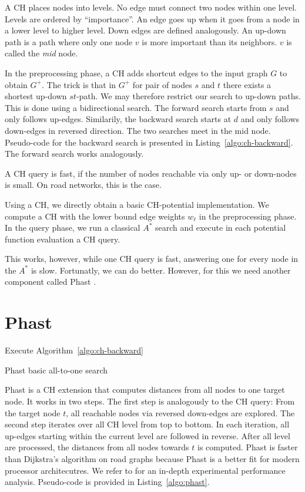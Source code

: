 \documentclass[a4paper,UKenglish,cleveref, autoref]{lipics-v2019}
\begin{document}
A CH places nodes into levels.
No edge must connect two nodes within one level.
Levels are ordered by ``importance''.
An edge goes up when it goes from a node in a lower level to higher level.
Down edges are defined analogously.
An up-down path is a path where only one node $v$ is more important than its neighbors.
$v$ is called the \emph{mid} node.

In the preprocessing phase, a CH adds shortcut edges to the input graph $G$ to obtain $G^+$.
The trick is that in $G^+$ for pair of nodes $s$ and $t$ there exists a shortest up-down $st$-path.
We may therefore restrict our search to up-down paths.
This is done using a bidirectional search.
The forward search starts from $s$ and only follows up-edges.
Similarily, the backward search starts at $d$ and only follows down-edges in reversed direction.
The two searches meet in the mid node.
Pseudo-code for the backward search is presented in Listing~\ref{algo:ch-backward}.
The forward search works analogously.

A CH query is fast, if the number of nodes reachable via only up- or down-nodes is small.
On road networks, this is the case.

Using a CH, we directly obtain a basic CH-potential implementation.
We compute a CH with the lower bound edge weights $w_\ell$ in the preprocessing phase.
In the query phase, we run a classical $A^*$ search and execute in each potential function evaluation a CH query.

This works, however, while one CH query is fast, answering one for every node in the $A^*$ is slow.
Fortunatly, we can do better.
However, for this we need another component called Phast \cite{Phast}.

\section{Phast}

\begin{algorithm2e}
Execute Algorithm~\ref{algo:ch-backward}\;
\caption{Phast basic all-to-one search}
\label{algo:phast}
\end{algorithm2e}

Phast \cite{Phast} is a CH extension that computes distances from all nodes to one target node.
It works in two steps.
The first step is analogously to the CH query:
From the target node $t$, all reachable nodes via reversed down-edges are explored.
The second step iterates over all CH level from top to bottom.
In each iteration, all up-edges starting within the current level are followed in reverse.
After all level are processed, the distances from all nodes towards $t$ is computed.
Phast is faster than Dijkstra's algorithm on road graphs because Phast is a better fit for modern processor architecutres.
We refer to \cite{Phast} for an in-depth experimental performance analysis.
Pseudo-code is provided in Listing~\ref{algo:phast}.
\end{document}
